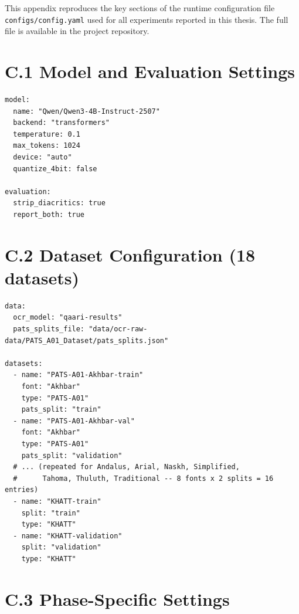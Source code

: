 
This appendix reproduces the key sections of the runtime configuration file
\texttt{configs/config.yaml} used for all experiments reported in this thesis.
The full file is available in the project repository.

\section*{C.1 \quad Model and Evaluation Settings}

\begin{lstlisting}
model:
  name: "Qwen/Qwen3-4B-Instruct-2507"
  backend: "transformers"
  temperature: 0.1
  max_tokens: 1024
  device: "auto"
  quantize_4bit: false

evaluation:
  strip_diacritics: true
  report_both: true
\end{lstlisting}

\section*{C.2 \quad Dataset Configuration (18 datasets)}

\begin{lstlisting}
data:
  ocr_model: "qaari-results"
  pats_splits_file: "data/ocr-raw-data/PATS_A01_Dataset/pats_splits.json"

datasets:
  - name: "PATS-A01-Akhbar-train"
    font: "Akhbar"
    type: "PATS-A01"
    pats_split: "train"
  - name: "PATS-A01-Akhbar-val"
    font: "Akhbar"
    type: "PATS-A01"
    pats_split: "validation"
  # ... (repeated for Andalus, Arial, Naskh, Simplified,
  #      Tahoma, Thuluth, Traditional -- 8 fonts x 2 splits = 16 entries)
  - name: "KHATT-train"
    split: "train"
    type: "KHATT"
  - name: "KHATT-validation"
    split: "validation"
    type: "KHATT"
\end{lstlisting}

\section*{C.3 \quad Phase-Specific Settings}

